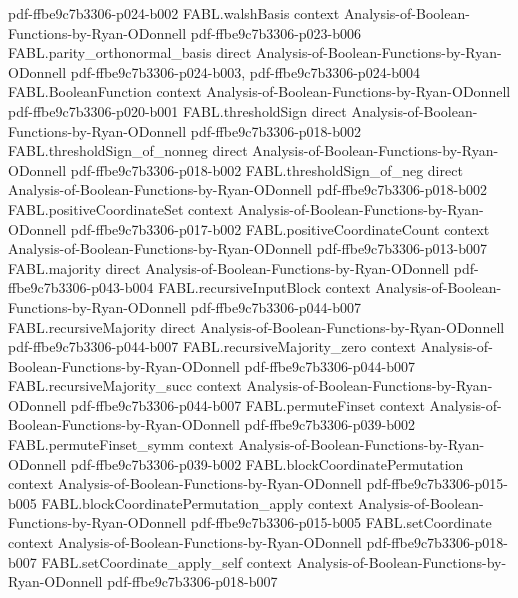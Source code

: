 \begin{theorem}
  {pdf-ffbe9c7b3306-p024-b002}
\proofstep
  {FABL.walshBasis}
  {context}
  {Analysis-of-Boolean-Functions-by-Ryan-ODonnell}
  {pdf-ffbe9c7b3306-p023-b006}
\proofstep
  {FABL.parity_orthonormal_basis}
  {direct}
  {Analysis-of-Boolean-Functions-by-Ryan-ODonnell}
  {pdf-ffbe9c7b3306-p024-b003,
    pdf-ffbe9c7b3306-p024-b004}
\proofstep
  {FABL.BooleanFunction}
  {context}
  {Analysis-of-Boolean-Functions-by-Ryan-ODonnell}
  {pdf-ffbe9c7b3306-p020-b001}
\proofstep
  {FABL.thresholdSign}
  {direct}
  {Analysis-of-Boolean-Functions-by-Ryan-ODonnell}
  {pdf-ffbe9c7b3306-p018-b002}
\proofstep
  {FABL.thresholdSign_of_nonneg}
  {direct}
  {Analysis-of-Boolean-Functions-by-Ryan-ODonnell}
  {pdf-ffbe9c7b3306-p018-b002}
\proofstep
  {FABL.thresholdSign_of_neg}
  {direct}
  {Analysis-of-Boolean-Functions-by-Ryan-ODonnell}
  {pdf-ffbe9c7b3306-p018-b002}
\proofstep
  {FABL.positiveCoordinateSet}
  {context}
  {Analysis-of-Boolean-Functions-by-Ryan-ODonnell}
  {pdf-ffbe9c7b3306-p017-b002}
\proofstep
  {FABL.positiveCoordinateCount}
  {context}
  {Analysis-of-Boolean-Functions-by-Ryan-ODonnell}
  {pdf-ffbe9c7b3306-p013-b007}
\proofstep
  {FABL.majority}
  {direct}
  {Analysis-of-Boolean-Functions-by-Ryan-ODonnell}
  {pdf-ffbe9c7b3306-p043-b004}
\proofstep
  {FABL.recursiveInputBlock}
  {context}
  {Analysis-of-Boolean-Functions-by-Ryan-ODonnell}
  {pdf-ffbe9c7b3306-p044-b007}
\proofstep
  {FABL.recursiveMajority}
  {direct}
  {Analysis-of-Boolean-Functions-by-Ryan-ODonnell}
  {pdf-ffbe9c7b3306-p044-b007}
\proofstep
  {FABL.recursiveMajority_zero}
  {context}
  {Analysis-of-Boolean-Functions-by-Ryan-ODonnell}
  {pdf-ffbe9c7b3306-p044-b007}
\proofstep
  {FABL.recursiveMajority_succ}
  {context}
  {Analysis-of-Boolean-Functions-by-Ryan-ODonnell}
  {pdf-ffbe9c7b3306-p044-b007}
\proofstep
  {FABL.permuteFinset}
  {context}
  {Analysis-of-Boolean-Functions-by-Ryan-ODonnell}
  {pdf-ffbe9c7b3306-p039-b002}
\proofstep
  {FABL.permuteFinset_symm}
  {context}
  {Analysis-of-Boolean-Functions-by-Ryan-ODonnell}
  {pdf-ffbe9c7b3306-p039-b002}
\proofstep
  {FABL.blockCoordinatePermutation}
  {context}
  {Analysis-of-Boolean-Functions-by-Ryan-ODonnell}
  {pdf-ffbe9c7b3306-p015-b005}
\proofstep
  {FABL.blockCoordinatePermutation_apply}
  {context}
  {Analysis-of-Boolean-Functions-by-Ryan-ODonnell}
  {pdf-ffbe9c7b3306-p015-b005}
\proofstep
  {FABL.setCoordinate}
  {context}
  {Analysis-of-Boolean-Functions-by-Ryan-ODonnell}
  {pdf-ffbe9c7b3306-p018-b007}
\proofstep
  {FABL.setCoordinate_apply_self}
  {context}
  {Analysis-of-Boolean-Functions-by-Ryan-ODonnell}
  {pdf-ffbe9c7b3306-p018-b007}

\end{theorem}
